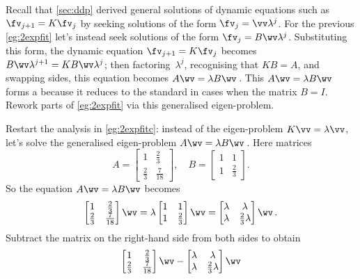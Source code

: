 \begin{example} \label{eg:2expfit2}
Recall that \autoref{sec:ddp} derived general solutions of dynamic equations such as \(\fv_{j+1}=K\fv_j\) by seeking solutions of the form \(\fv_j=\vv\lambda^j\).
For the previous \autoref{eg:2expfit} let's instead seek solutions of the form \(\fv_j=B\wv\lambda^j\).
Substituting this form, the dynamic equation \(\fv_{j+1}=K\fv_j\) becomes \(B\wv\lambda^{j+1}=KB\wv\lambda^j\); then factoring~\(\lambda^j\), recognising that \(KB=A\), and swapping sides, this equation becomes \(A\wv=\lambda B\wv\)\,.
This \(A\wv=\lambda B\wv\) forms a  because it reduces to the standard  in cases when the matrix \(B=I\).
Rework parts of \autoref{eg:2expfit} via this generalised eigen-problem.

\begin{solution} 
Restart the analysis in \autoref{eg:2expfitc}: instead of the eigen-problem \(K\vv=\lambda\vv\), let's solve the generalised eigen-problem \(A\wv=\lambda B\wv\)\,.
Here matrices
\begin{equation*}
A=\begin{bmatrix} 1&\frac23\\\frac23&\frac7{18} \end{bmatrix},\quad
B=\begin{bmatrix} 1&1\\1&\frac23 \end{bmatrix}.
\end{equation*}
So the equation \(A\wv=\lambda B\wv\) becomes
\begin{equation*}
\begin{bmatrix} 1&\frac23\\\frac23&\frac7{18} \end{bmatrix}\wv
=\lambda \begin{bmatrix} 1&1\\1&\frac23 \end{bmatrix}\wv
= \begin{bmatrix} \lambda&\lambda\\\lambda&\frac23\lambda \end{bmatrix}\wv\,.
\end{equation*}
Subtract the matrix on the right-hand side from both sides to obtain
\begin{equation*}
\begin{bmatrix} 1&\frac23\\\frac23&\frac7{18} \end{bmatrix}\wv
- \begin{bmatrix} \lambda&\lambda\\\lambda&\frac23\lambda \end{bmatrix}\wv 

\end{equation*}
\end{solution}
\end{example}
